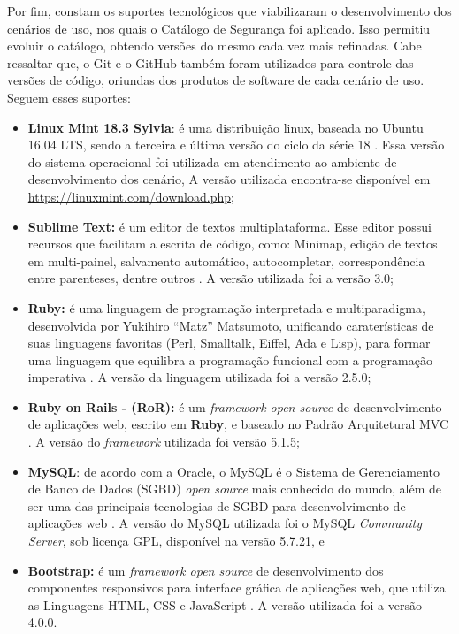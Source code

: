 Por fim, constam os suportes tecnológicos que viabilizaram o desenvolvimento dos cenários de uso, nos quais o Catálogo de Segurança foi aplicado. Isso permitiu evoluir o catálogo, obtendo versões do mesmo cada vez mais refinadas. Cabe ressaltar que, o Git e o GitHub também foram utilizados para controle das versões de código, oriundas dos produtos de software de cada cenário de uso. Seguem esses suportes:

\begin{itemize}
	
	\item \textbf{Linux Mint 18.3 Sylvia}: é uma distribuição linux, baseada no Ubuntu 16.04 LTS, sendo a terceira e última versão do ciclo da série 18 \cite{Mint}. Essa versão do sistema operacional foi utilizada em atendimento ao ambiente de desenvolvimento dos cenário, A versão utilizada encontra-se disponível em  \url{https://linuxmint.com/download.php};
	
	\item \textbf{Sublime Text:} é um editor de textos multiplataforma. Esse editor possui recursos que facilitam a escrita de código, como: Minimap, edição de textos em multi-painel, salvamento automático, autocompletar, correspondência entre parenteses, dentre outros \cite{SublimeText}. A versão utilizada foi a versão 3.0;
	
	\item \textbf{Ruby:} é uma linguagem de programação interpretada e multiparadigma, desenvolvida por Yukihiro “Matz” Matsumoto, unificando caraterísticas de suas linguagens favoritas (Perl, Smalltalk, Eiffel, Ada e Lisp), para formar uma linguagem que equilibra a programação funcional com a programação imperativa \cite{Ruby}. A versão da linguagem utilizada foi a versão 2.5.0;
	
	\item \textbf{Ruby on Rails - (RoR):} é um  \textit{framework open source} de desenvolvimento de aplicações web, escrito em \textbf{Ruby}, e baseado no Padrão Arquitetural MVC \cite{RoR}. A versão do \textit{framework} utilizada foi versão 5.1.5;
	
	\item \textbf{MySQL}: de acordo com a Oracle, o MySQL é o Sistema de Gerenciamento de Banco de Dados (SGBD) \textit{open source} mais conhecido do mundo, além de ser uma das principais tecnologias de SGBD para desenvolvimento de aplicações web \cite{MySQL}. A versão do MySQL utilizada foi o MySQL \textit{Community Server}, sob licença GPL, disponível na versão 5.7.21, e
	
	\item \textbf{Bootstrap:} é um \textit{framework open source} de desenvolvimento dos componentes responsivos para interface gráfica de aplicações web, que utiliza as Linguagens HTML, CSS e JavaScript \cite{Bootstrap}. A versão utilizada foi a versão 4.0.0. 
	
\end{itemize}


